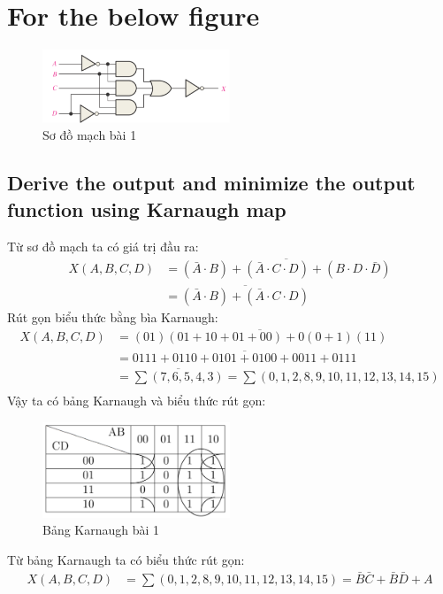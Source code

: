 \section{For the below figure}
    \begin{figure}[H]
        \centering
        \includegraphics[width=0.5\textwidth]{pictures/1_diagram.png}
        \caption{Sơ đồ mạch bài 1}
    \end{figure}
    \subsection{Derive the output and minimize the output function using Karnaugh map}
        \hspace*{0.6cm}Từ sơ đồ mạch ta có giá trị đầu ra:
        \begin{align*}
            X(A, B, C, D) &= \overline{(\bar{A} \cdot B) + (\bar{A} \cdot C \cdot D) + (B \cdot D \cdot \bar{D})} \\
            &= \overline{(\bar{A} \cdot B) + (\bar{A} \cdot C \cdot D)}  
        \end{align*}
        \hspace*{0.6cm}Rút gọn biểu thức bằng bìa Karnaugh:
        \begin{align*}
            X(A, B, C, D) &= \overline{(01)(01 + 10 + 01 + 00) + 0(0 + 1) (11)} \\
            &= \overline{0111 + 0110 + 0101 + 0100 + 0011 + 0111} \\
            &= \overline{\sum{(7,6,5,4,3)}} = \sum{(0,1,2,8,9,10,11,12,13,14,15)} \\
        \end{align*}
        \hspace*{0.6cm}Vậy ta có bảng Karnaugh và biểu thức rút gọn:
        \begin{figure}[H]
            \centering
            \includegraphics[width=0.5\textwidth]{pictures/1_karnaugh.png}
            \caption{Bảng Karnaugh bài 1}
        \end{figure}
        Từ bảng Karnaugh ta có biểu thức rút gọn:
        \begin{align*}
            X(A, B, C, D) &= \sum{(0,1,2,8,9,10,11,12,13,14,15)} = \bar{B}\bar{C} + \bar{B}\bar{D} + A\\
        \end{align*}
